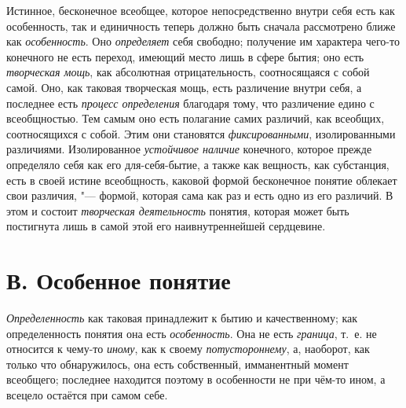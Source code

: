 {Истинное, бесконечное всеобщее, которое непосредственно внутри
себя есть как особенность, так и единичность теперь должно быть сначала
рассмотрено ближе как
{\em особенность}. Оно
{\em определяет} себя
свободно; получение им характера чего-то конечного не есть переход, имеющий
место лишь в сфере бытия; оно есть
{\em творческая мощь},
как абсолютная отрицательность, соотносящаяся с собой самой.
Оно, как таковая творческая мощь, есть различение внутри себя, а последнее
есть {\em процесс определения}
благодаря тому, что различение едино с всеобщностью. Тем
самым оно есть полагание самих различий, как всеобщих, соотносящихся с
собой. Этим они становятся
{\em фиксированными},
изолированными различиями. Изолированное
{\em устойчивое наличие}
конечного, которое прежде определяло себя как его
для-себя-бытие, а также как вещность, как субстанция, есть в своей истине
всеобщность, каковой формой бесконечное понятие облекает свои различия, "---
формой, которая сама как раз и есть одно из его различий. В
этом и состоит {\em творческая
деятельность} понятия, которая может быть постигнута лишь в
самой этой его наивнутреннейшей сердцевине.

\section[В. Особенное понятие]{В. Особенное понятие}
{\em Определенность} как
таковая принадлежит к бытию и качественному; как определенность понятия она
есть {\em особенность}.
Она не есть
{\em граница}, т.~е. не
относится к чему-то {\em иному},
как к своему
{\em потустороннему}, а,
наоборот, как только что обнаружилось, она есть собственный, имманентный
момент всеобщего; последнее находится поэтому в особенности не
при чём-то ином, а всецело остаётся при самом себе.

}

